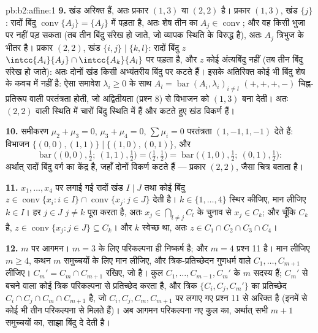 \begin{solution}{pb:b2:affine:1}
\textbf{9.} खंड अरिक्त हैं, अतः प्रकार $(1,3)$ या $(2,2)$ है। प्रकार $(1,3)$, खंड $\{j\}$:
रादों बिंदु $\operatorname{conv}\{A_j\} = \{A_j\}$ में पड़ता है, अतः शेष तीन का $A_j \in
\operatorname{conv}$; और वह किसी भुजा पर नहीं
पड़ सकता (तब तीन बिंदु संरेख हो जाते, जो व्यापक स्थिति के विरुद्ध है), अतः
$A_j$ त्रिभुज के भीतर है। प्रकार $(2,2)$, खंड $\{i,j\} \mid \{k,l\}$: रादों बिंदु $z$ $\intcc{A_i}{A_j} \cap \intcc{A_k}{A_l}$ पर पड़ता
है, और $z$ कोई अंत्यबिंदु नहीं (तब तीन बिंदु संरेख हो जाते): अतः दोनों
खंड किसी अभ्यंतरीय बिंदु पर कटते हैं। इसके अतिरिक्त कोई भी बिंदु शेष के
कवच में नहीं है: ऐसा समावेश $\lambda_i \geq 0$ के साथ $A_l =
\operatorname{bar}(A_i, \lambda_i)_{i \neq l}$ $(+,+,+,-)$ चिह्न-प्रतिरूप वाली 
परतंत्रता होती, जो अद्वितीयता (प्रश्न 8) से विभाजन को $(1,3)$ बना देती। अतः
$(2,2)$ वाली स्थिति में चारों बिंदु  स्थिति में हैं और कटते हुए खंड
विकर्ण हैं।

\textbf{10.} समीकरण $\mu_2 + \mu_3 = 0$, $\mu_3 +
\mu_4 = 0$, $\sum\mu_i = 0$ परतंत्रता $(1, -1, 1,
-1)$ देते हैं: विभाजन $\{(0,0), (1,1)\} \mid \{(1,0), (0,1)\}$, और
\[
\operatorname{bar}\bigl((0,0), \tfrac12;\ (1,1),
\tfrac12\bigr) = \bigl(\tfrac12, \tfrac12\bigr) =
\operatorname{bar}\bigl((1,0), \tfrac12;\ (0,1),
\tfrac12\bigr) :
\]
अर्थात् रादों बिंदु वर्ग का केंद्र है, जहाँ दोनों विकर्ण कटते हैं ---
प्रकार $(2,2)$, जैसा चित्र बताता है।

\textbf{11.} $x_1, \dots, x_4$ पर लगाई गई रादों खंड $I \mid J$ तथा कोई बिंदु $z \in \operatorname{conv}\{x_i : i
\in I\} \cap \operatorname{conv}\{x_j : j \in J\}$ देती है। $k
\in \{1, \dots, 4\}$
स्थिर कीजिए, मान लीजिए $k \in I$। हर $j \in J$ $j \neq k$ पूरा करता है, अतः $x_j \in
\bigcap_{l \neq j}C_l$ के चुनाव से
$x_j \in C_k$; और चूँकि $C_k$  है, $z \in
\operatorname{conv}\{x_j : j \in J\} \subseteq C_k$। और $k$ स्वेच्छ था, अतः $z \in C_1 \cap C_2 \cap C_3 \cap C_4$।

\textbf{12.} $m$ पर आगमन। $m = 3$ के लिए परिकल्पना ही निष्कर्ष है; और $m = 4$
प्रश्न 11 है। मान लीजिए $m \geq 4$, कथन $m$ समुच्चयों के लिए मान लीजिए, और
त्रिक-प्रतिच्छेदन गुणधर्म वाले $C_1, \dots,
C_{m+1}$ लीजिए। $C_m' =
C_m \cap C_{m+1}$ रखिए, जो  है। कुल $C_1, \dots, C_{m-1},
C_m'$
के $m$ सदस्य हैं; $C_m'$ से बचने वाला कोई त्रिक परिकल्पना से प्रतिच्छेद करता
है, और त्रिक $\{C_i, C_j, C_m'\}$ का प्रतिच्छेद $C_i \cap C_j \cap C_m \cap C_{m+1}$ है, जो $C_i, C_j, C_m, C_{m+1}$ पर लगाए गए प्रश्न 11 से
अरिक्त है (इनमें से कोई भी तीन परिकल्पना से मिलते हैं)। अब आगमन परिकल्पना
नए कुल का, अर्थात् सभी $m+1$ समुच्चयों का, साझा बिंदु दे देती है।


\end{solution}
